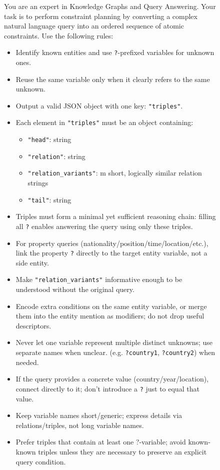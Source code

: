 \documentclass{article}
\theoremstyle{plain}
\theoremstyle{definition}
\theoremstyle{remark}
\begin{document}
\begin{figure}[ht]
    \centering
    \begin{fullwidthprompt}
You are an expert in Knowledge Graphs and Query Answering. 
Your task is to perform constraint planning by converting a complex natural language query into an ordered sequence of atomic constraints. Use the following rules:

\vspace{0.3em}
\begin{itemize}
    \setlength\itemsep{0em}
    \item Identify known entities and use \texttt{?}-prefixed variables for unknown ones.
    \item Reuse the same variable only when it clearly refers to the same unknown.
    \item Output a valid JSON object with one key: \texttt{"triples"}.
    \item Each element in \texttt{"triples"} must be an object containing:
    \begin{itemize}
        \setlength\itemsep{0em}
        \item \texttt{"head"}: string
        \item \texttt{"relation"}: string
        \item \texttt{"relation\_variants"}: m short, logically similar relation strings
        \item \texttt{"tail"}: string
    \end{itemize}
    \item Triples must form a minimal yet sufficient reasoning chain: filling all \texttt{?} enables answering the query using only these triples.
    \item For property queries (nationality/position/time/location/etc.), link the property \texttt{?} directly to the target entity variable, not a side entity.
    \item Make \texttt{"relation\_variants"} informative enough to be understood without the original query.
    \item Encode extra conditions on the same entity variable, or merge them into the entity mention as modifiers; do not drop useful descriptors.
    \item Never let one variable represent multiple distinct unknowns; use separate names when unclear. (e.g. \texttt{?country1}, \texttt{?country2}) when needed.
    \item If the query provides a concrete value (country/year/location), connect directly to it; don't introduce a \texttt{?} just to equal that value.
    \item Keep variable names short/generic; express details via relations/triples, not long variable names.
    \item Prefer triples that contain at least one ?-variable; avoid known-known triples unless they are necessary to preserve an explicit query condition.
\end{itemize}


\end{fullwidthprompt}
\end{figure}
\end{document}
